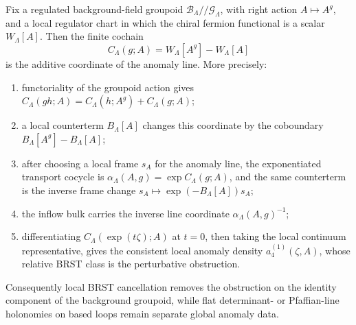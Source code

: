 \begin{proposition}
\label{prop:anomaly-coordinate-comparison}
Fix a regulated background-field groupoid
\(\mathcal B_\Lambda//\mathcal G_\Lambda\), with right action
\(A\mapsto A^g\), and a local regulator chart in which the chiral fermion
functional is a scalar \(W_\Lambda[A]\).  Then the finite cochain
\[
  C_\Lambda(g;A)=W_\Lambda[A^g]-W_\Lambda[A]
\]
is the additive coordinate of the anomaly line.  More precisely:
\begin{enumerate}
  \item functoriality of the groupoid action gives
  \(C_\Lambda(gh;A)=C_\Lambda(h;A^g)+C_\Lambda(g;A)\);
  \item a local counterterm \(B_\Lambda[A]\) changes this coordinate by the
  coboundary \(B_\Lambda[A^g]-B_\Lambda[A]\);
  \item after choosing a local frame \(s_A\) for the anomaly line, the
  exponentiated transport cocycle is
  \(\alpha_\Lambda(A,g)=\exp C_\Lambda(g;A)\), and the same counterterm is
  the inverse frame change \(s_A\mapsto \exp(-B_\Lambda[A])s_A\);
  \item the inflow bulk carries the inverse line coordinate
  \(\alpha_\Lambda(A,g)^{-1}\);
  \item differentiating \(C_\Lambda(\exp(t\zeta);A)\) at \(t=0\), then taking
  the local continuum representative, gives the consistent local anomaly
  density \(a_4^{(1)}(\zeta,A)\), whose relative BRST class is the
  perturbative obstruction.
\end{enumerate}
Consequently local BRST cancellation removes the obstruction on the identity
component of the background groupoid, while flat determinant- or Pfaffian-line
holonomies on based loops remain separate global anomaly data.
\end{proposition}

